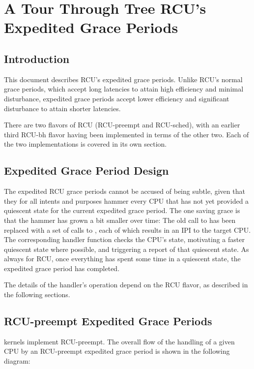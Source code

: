 \section{A Tour Through Tree RCU's Expedited Grace Periods}
\label{sec:rcu:A Tour Through Tree RCU's Expedited Grace Periods}


\subsection{Introduction}

This document describes RCU's expedited grace periods.
Unlike RCU's normal grace periods, which accept long latencies to attain
high efficiency and minimal disturbance, expedited grace periods accept
lower efficiency and significant disturbance to attain shorter latencies.

There are two flavors of RCU (RCU-preempt and RCU-sched), with an earlier
third RCU-bh flavor having been implemented in terms of the other two.
Each of the two implementations is covered in its own section.


\subsection{Expedited Grace Period Design}

The expedited RCU grace periods cannot be accused of being subtle,
given that they for all intents and purposes hammer every CPU that
has not yet provided a quiescent state for the current expedited
grace period.
The one saving grace is that the hammer has grown a bit smaller
over time:
The old call to  has been
replaced with a set of calls to ,
each of which results in an IPI to the target CPU\@.
The corresponding handler function checks the CPU's state, motivating
a faster quiescent state where possible, and triggering a report
of that quiescent state.
As always for RCU, once everything has spent some time in a quiescent
state, the expedited grace period has completed.

The details of the  handler's
operation depend on the RCU flavor, as described in the following
sections.


\subsection{RCU-preempt Expedited Grace Periods}

 kernels implement RCU-preempt.
The overall flow of the handling of a given CPU by an RCU-preempt
expedited grace period is shown in the following diagram:

